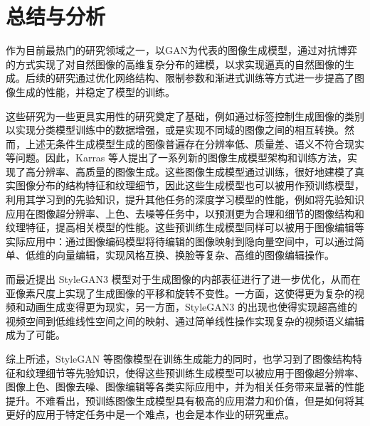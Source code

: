 \chapter{总结与分析}
\label{chap:3}


作为目前最热门的研究领域之一，以GAN为代表的图像生成模型，通过对抗博弈的方式实现了对自然图像的高维复杂分布的建模，以求实现逼真的自然图像的生成。后续的研究通过优化网络结构、限制参数和渐进式训练等方式进一步提高了图像生成的性能，并稳定了模型的训练。

这些研究为一些更具实用性的研究奠定了基础，例如通过标签控制生成图像的类别以实现分类模型训练中的数据增强，或是实现不同域的图像之间的相互转换。然而，上述无条件生成模型生成的图像普遍存在分辨率低、质量差、语义不符合现实等问题。因此，Karras 等人提出了一系列新的图像生成模型架构和训练方法，实现了高分辨率、高质量的图像生成。这些图像生成模型通过训练，很好地建模了真实图像分布的结构特征和纹理细节，因此这些生成模型也可以被用作预训练模型，利用其学习到的先验知识，提升其他任务的深度学习模型的性能，例如将先验知识应用在图像超分辨率、上色、去噪等任务中，以预测更为合理和细节的图像结构和纹理特征，提高相关模型的性能。这些预训练生成模型同样可以被用于图像编辑等实际应用中：通过图像编码模型将待编辑的图像映射到隐向量空间中，可以通过简单、低维的向量编辑，实现风格互换、换脸等复杂、高维的图像编辑操作。

而最近提出 StyleGAN3 模型对于生成图像的内部表征进行了进一步优化，从而在亚像素尺度上实现了生成图像的平移和旋转不变性。一方面，这使得更为复杂的视频和动画生成变得更为现实，另一方面，StyleGAN3 的出现也使得实现超高维的视频空间到低维线性空间之间的映射、通过简单线性操作实现复杂的视频语义编辑成为了可能。

综上所述，StyleGAN 等图像模型在训练生成能力的同时，也学习到了图像结构特征和纹理细节等先验知识，使得这些预训练生成模型可以被应用于图像超分辨率、图像上色、图像去噪、图像编辑等各类实际应用中，并为相关任务带来显著的性能提升。不难看出，预训练图像生成模型具有极高的应用潜力和价值，但是如何将其更好的应用于特定任务中是一个难点，也会是本作业的研究重点。
